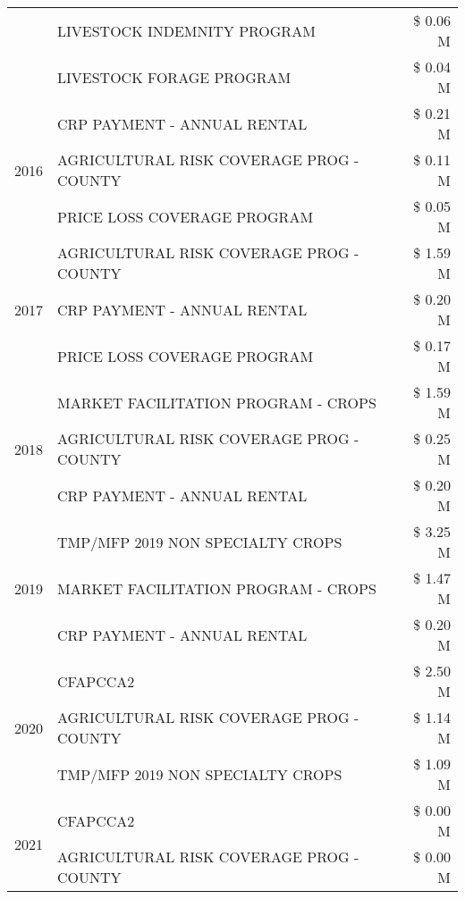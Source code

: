 \begin{tabular}{llr}
 & LIVESTOCK INDEMNITY PROGRAM & \$ 0.06 M \\
 & LIVESTOCK FORAGE PROGRAM & \$ 0.04 M \\
\cline{1-3}
\multirow[t]{3}{*}{2016} & CRP PAYMENT - ANNUAL RENTAL                   & \$ 0.21 M \\
 & AGRICULTURAL RISK COVERAGE PROG - COUNTY      & \$ 0.11 M \\
 & PRICE LOSS COVERAGE PROGRAM                   & \$ 0.05 M \\
\cline{1-3}
\multirow[t]{3}{*}{2017} & AGRICULTURAL RISK COVERAGE PROG - COUNTY & \$ 1.59 M \\
 & CRP PAYMENT - ANNUAL RENTAL & \$ 0.20 M \\
 & PRICE LOSS COVERAGE PROGRAM & \$ 0.17 M \\
\cline{1-3}
\multirow[t]{3}{*}{2018} & MARKET FACILITATION PROGRAM - CROPS & \$ 1.59 M \\
 & AGRICULTURAL RISK COVERAGE PROG - COUNTY & \$ 0.25 M \\
 & CRP PAYMENT - ANNUAL RENTAL & \$ 0.20 M \\
\cline{1-3}
\multirow[t]{3}{*}{2019} & TMP/MFP 2019 NON SPECIALTY CROPS & \$ 3.25 M \\
 & MARKET FACILITATION PROGRAM - CROPS & \$ 1.47 M \\
 & CRP PAYMENT - ANNUAL RENTAL & \$ 0.20 M \\
\cline{1-3}
\multirow[t]{3}{*}{2020} & CFAPCCA2 & \$ 2.50 M \\
 & AGRICULTURAL RISK COVERAGE PROG - COUNTY & \$ 1.14 M \\
 & TMP/MFP 2019 NON SPECIALTY CROPS & \$ 1.09 M \\
\cline{1-3}
\multirow[t]{2}{*}{2021} & CFAPCCA2 & \$ 0.00 M \\
 & AGRICULTURAL RISK COVERAGE PROG - COUNTY & \$ 0.00 M \\
\cline{1-3}
\bottomrule
\end{tabular}
